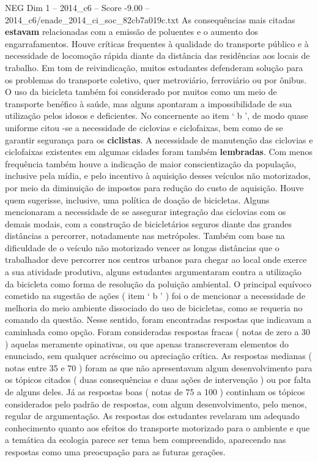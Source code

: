 \begin{textsample}{NEG Dim 1 – 2014\_c6 – Score -9.00 – 2014\_c6/enade\_2014\_ci\_soc\_82cb7a019c.txt}
As consequências mais citadas \textbf{estavam} relacionadas com a emissão de poluentes e o aumento dos engarrafamentos.
Houve críticas frequentes à qualidade do transporte público e à necessidade de locomoção rápida diante da distância das residências aos locais de trabalho.
Em tom de reivindicação, muitos estudantes defenderam solução para os problemas do transporte coletivo, quer metroviário, ferroviário ou por ônibus.
O uso da bicicleta também foi considerado por muitos como um meio de transporte benéfico à saúde, mas alguns apontaram a impossibilidade de sua utilização pelos idosos e deficientes.
No concernente ao item ‘ b ’, de modo quase uniforme citou -se a necessidade de ciclovias e ciclofaixas, bem como de se garantir segurança para os \textbf{ciclistas}.
A necessidade de manutenção das ciclovias e ciclofaixas existentes em algumas cidades foram também \textbf{lembradas}.
Com menos frequência também houve a indicação de maior conscientização da população, inclusive pela mídia, e pelo incentivo à aquisição desses veículos não motorizados, por meio da diminuição de impostos para redução do custo de aquisição.
Houve quem sugerisse, inclusive, uma política de doação de bicicletas.
Alguns mencionaram a necessidade de se assegurar integração das ciclovias com os demais modais, com a construção de bicicletários seguros diante das grandes distâncias a percorrer, notadamente nas metrópoles.
Também com base na dificuldade de o veículo não motorizado vencer as longas distâncias que o trabalhador deve percorrer nos centros urbanos para chegar ao local onde exerce a sua atividade produtiva, alguns estudantes argumentaram contra a utilização da bicicleta como forma de resolução da poluição ambiental.
O principal equívoco cometido na sugestão de ações ( item ‘ b ’ ) foi o de mencionar a necessidade de melhoria do meio ambiente dissociado do uso de bicicletas, como se requeria no comando da questão.
Nesse sentido, foram encontradas respostas que indicavam a caminhada como opção.
Foram consideradas respostas fracas ( notas de zero a 30 ) aquelas meramente opinativas, ou que apenas transcreveram elementos do enunciado, sem qualquer acréscimo ou apreciação crítica.
As respostas medianas ( notas entre 35 e 70 ) foram as que não apresentavam algum desenvolvimento para os tópicos citados ( duas consequências e duas ações de intervenção ) ou por falta de alguns deles.
Já as respostas boas ( notas de 75 a 100 ) continham os tópicos considerados pelo padrão de respostas, com algum desenvolvimento, pelo menos, regular de argumentação.
As respostas dos estudantes revelaram um adequado conhecimento quanto aos efeitos do transporte motorizado para o ambiente e que a temática da ecologia parece ser tema bem compreendido, aparecendo nas respostas como uma preocupação para as futuras gerações.

\end{textsample}
